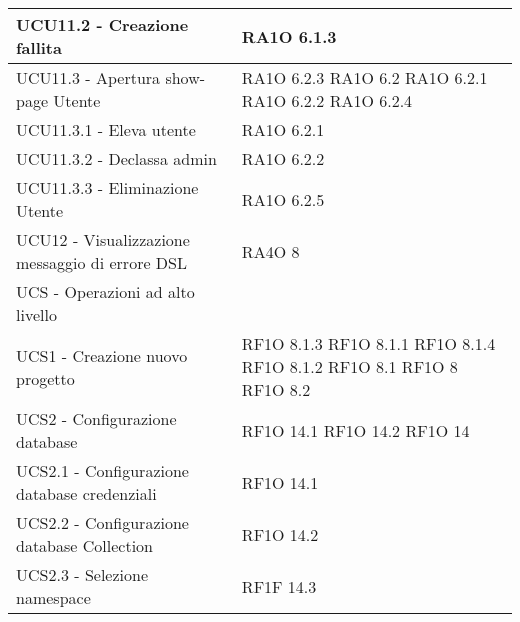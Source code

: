 \begin{center}
\begin{longtable}{ | p{5cm} | p{5cm} |}
            UCU11.2 - Creazione fallita &  RA1O 6.1.3  \newline  \\ \hline      
            UCU11.3 - Apertura show-page Utente &  RA1O 6.2.3 \newline  RA1O 6.2  \newline  RA1O 6.2.1 \newline  RA1O 6.2.2 \newline  RA1O 6.2.4 \newline  \\ \hline      
            UCU11.3.1 - Eleva utente &  RA1O 6.2.1 \newline  \\ \hline      
            UCU11.3.2 - Declassa admin &  RA1O 6.2.2 \newline  \\ \hline      
            UCU11.3.3 - Eliminazione Utente &  RA1O 6.2.5 \newline  \\ \hline      
            UCU12 - Visualizzazione messaggio di errore DSL &  RA4O 8 \newline  \\ \hline      
            UCS - Operazioni ad alto livello &  \\ \hline      
            UCS1 - Creazione nuovo progetto &  RF1O 8.1.3  \newline  RF1O 8.1.1  \newline  RF1O 8.1.4  \newline  RF1O 8.1.2 \newline  RF1O 8.1  \newline  RF1O 8  \newline  RF1O 8.2  \newline  \\ \hline      
            UCS2 - Configurazione database &  RF1O 14.1 \newline  RF1O 14.2 \newline  RF1O 14 \newline  \\ \hline      
            UCS2.1 - Configurazione database credenziali &  RF1O 14.1 \newline  \\ \hline      
            UCS2.2 - Configurazione database Collection &  RF1O 14.2 \newline  \\ \hline      
            UCS2.3 - Selezione namespace &  RF1F 14.3 \newline  \\ \hline      

\end{longtable}
\end{center}
